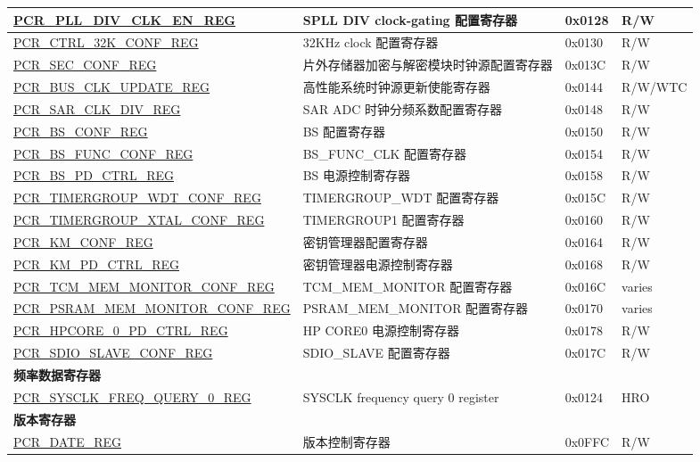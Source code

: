 \begin{longtable}{ | p{7.2cm} | p{6cm} | p{1.3cm} | p{1cm} | }
\hyperref[regdesc:PCRPLLDIVCLKENREG]{PCR\_PLL\_DIV\_CLK\_EN\_REG} & SPLL DIV clock-gating 配置寄存器 & 0x0128 & R/W \\ \hline
\hyperref[regdesc:PCRCTRL32KCONFREG]{PCR\_CTRL\_32K\_CONF\_REG} & 32KHz clock 配置寄存器 & 0x0130 & R/W \\ \hline
\hyperref[regdesc:PCRSECCONFREG]{PCR\_SEC\_CONF\_REG} & 片外存储器加密与解密模块时钟源配置寄存器 & 0x013C & R/W \\ \hline
\hyperref[regdesc:PCRBUSCLKUPDATEREG]{PCR\_BUS\_CLK\_UPDATE\_REG} & 高性能系统时钟源更新使能寄存器 & 0x0144 & R/W/WTC \\ \hline
\hyperref[regdesc:PCRSARCLKDIVREG]{PCR\_SAR\_CLK\_DIV\_REG} & SAR ADC 时钟分频系数配置寄存器 & 0x0148 & R/W \\ \hline
\hyperref[regdesc:PCRBSCONFREG]{PCR\_BS\_CONF\_REG} & BS 配置寄存器 & 0x0150 & R/W \\ \hline
\hyperref[regdesc:PCRBSFUNCCONFREG]{PCR\_BS\_FUNC\_CONF\_REG} & BS\_FUNC\_CLK 配置寄存器 & 0x0154 & R/W \\ \hline
\hyperref[regdesc:PCRBSPDCTRLREG]{PCR\_BS\_PD\_CTRL\_REG} & BS 电源控制寄存器 & 0x0158 & R/W \\ \hline
\hyperref[regdesc:PCRTIMERGROUPWDTCONFREG]{PCR\_TIMERGROUP\_WDT\_CONF\_REG} & TIMERGROUP\_WDT 配置寄存器 & 0x015C & R/W \\ \hline
\hyperref[regdesc:PCRTIMERGROUPXTALCONFREG]{PCR\_TIMERGROUP\_XTAL\_CONF\_REG} & TIMERGROUP1 配置寄存器 & 0x0160 & R/W \\ \hline
\hyperref[regdesc:PCRKMCONFREG]{PCR\_KM\_CONF\_REG} & 密钥管理器配置寄存器 & 0x0164 & R/W \\ \hline
\hyperref[regdesc:PCRKMPDCTRLREG]{PCR\_KM\_PD\_CTRL\_REG} & 密钥管理器电源控制寄存器 & 0x0168 & R/W \\ \hline
\hyperref[regdesc:PCRTCMMEMMONITORCONFREG]{PCR\_TCM\_MEM\_MONITOR\_CONF\_REG} & TCM\_MEM\_MONITOR 配置寄存器 & 0x016C & varies \\ \hline
\hyperref[regdesc:PCRPSRAMMEMMONITORCONFREG]{PCR\_PSRAM\_MEM\_MONITOR\_CONF\_REG} & PSRAM\_MEM\_MONITOR 配置寄存器 & 0x0170 & varies \\ \hline
\hyperref[regdesc:PCRHPCORE0PDCTRLREG]{PCR\_HPCORE\_0\_PD\_CTRL\_REG} & HP CORE0 电源控制寄存器 & 0x0178 & R/W \\ \hline
\hyperref[regdesc:PCRSDIOSLAVECONFREG]{PCR\_SDIO\_SLAVE\_CONF\_REG} & SDIO\_SLAVE 配置寄存器 & 0x017C & R/W \\ \hline
\multicolumn{4}{|l|}{\textbf{频率数据寄存器}} \\ \hline
\hyperref[regdesc:PCRSYSCLKFREQQUERY0REG]{PCR\_SYSCLK\_FREQ\_QUERY\_0\_REG} & SYSCLK frequency query 0 register & 0x0124 & HRO \\ \hline
\multicolumn{4}{|l|}{\textbf{版本寄存器}} \\ \hline
\hyperref[regdesc:PCRDATEREG]{PCR\_DATE\_REG} & 版本控制寄存器 & 0x0FFC & R/W \\ \hline
\end{longtable}
